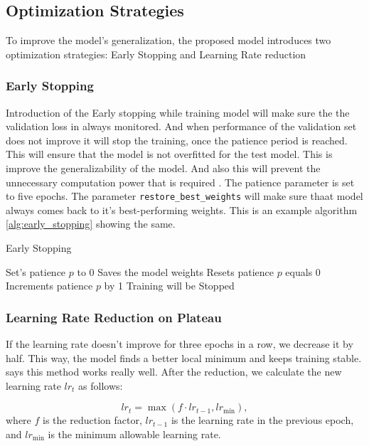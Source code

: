 \documentclass[12pt,onecolumn]{report}
\begin{document}
\subsection{Optimization Strategies}
To improve the model's generalization, the proposed model introduces two optimization strategies: Early Stopping and Learning Rate reduction

\subsubsection{Early Stopping}
Introduction of the Early stopping while training model will make sure the the validation loss in always monitored. And when performance of the validation set does not improve it will stop the training, once the patience period is reached. This will ensure that the model is not overfitted for the test model. This is improve the generalizability of the model. And also this will prevent the unnecessary computation power that is required \cite{1996Lutz}. The patience parameter is set to five epochs. The parameter \texttt{restore\_best\_weights} will make sure thaat model always comes back to it's best-performing weights. This is an example algorithm \ref{alg:early_stopping} showing the same.

\begin{algorithm}[h]
\caption{Early Stopping}
\label{alg:early_stopping}
\begin{algorithmic}[1]
\State Set's patience \( p \) to 0
        \State Saves the model weights
        \State Resets patience \( p \) equals 0
    \Else
        \State Increments patience \( p \) by 1
    \EndIf
        \State Training will be Stopped
    \EndIf
\EndFor
\end{algorithmic}
\end{algorithm}

\subsubsection{Learning Rate Reduction on Plateau}
If the learning rate doesn’t improve for three epochs in a row, we decrease it by half. This way, the model finds a better local minimum and keeps training stable. \cite{2017Loshchilov} says this method works really well. After the reduction, we calculate the new learning rate \(lr_t\) as follows:

\begin{equation}
    lr_t = \max(f \cdot lr_{t-1}, lr_{\text{min}}),
\end{equation}
where \(f\) is the reduction factor, \(lr_{t-1}\) is the learning rate in the previous epoch, and \(lr_{\text{min}}\) is the minimum allowable learning rate.
\end{document}
